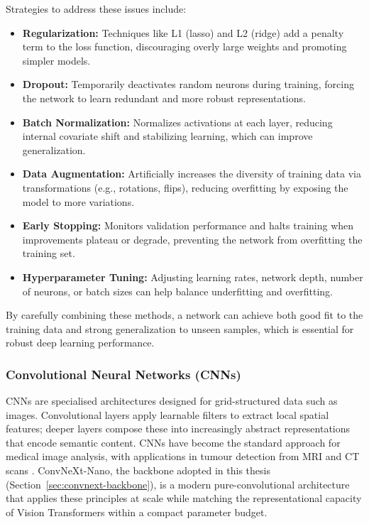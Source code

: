Strategies to address these issues include:

\begin{itemize}
    \item \textbf{Regularization:} Techniques like L1 (lasso) and L2 (ridge)
    add a penalty term to the loss function, discouraging overly large weights and promoting simpler models.
    \item \textbf{Dropout:} Temporarily deactivates random neurons during
    training, forcing the network to learn redundant and more robust representations.
    \item \textbf{Batch Normalization:} Normalizes activations at each layer,
    reducing internal covariate shift and stabilizing learning, which can improve generalization.
    \item \textbf{Data Augmentation:} Artificially increases the diversity of
    training data via transformations (e.g., rotations, flips), reducing overfitting by exposing the model to more variations.
    \item \textbf{Early Stopping:} Monitors validation performance and halts
    training when improvements plateau or degrade, preventing the network from overfitting the training set.
    \item \textbf{Hyperparameter Tuning:} Adjusting learning rates, network depth,
    number of neurons, or batch sizes can help balance underfitting and overfitting.
\end{itemize}

By carefully combining these methods, a network can achieve both good fit to the
training data and strong generalization to unseen samples, which is essential for
robust deep learning performance.

\subsubsection{Convolutional Neural Networks (CNNs)}

CNNs are specialised architectures designed for grid-structured data such as images.
Convolutional layers apply learnable filters to extract local spatial features;
deeper layers compose these into increasingly abstract representations that encode
semantic content.
CNNs have become the standard approach for medical image analysis, with applications
in tumour detection from MRI and CT scans \cite{litjens2017survey}.
ConvNeXt-Nano, the backbone adopted in this thesis
(Section~\ref{sec:convnext-backbone}), is a modern pure-convolutional architecture
that applies these principles at scale while matching the representational capacity
of Vision Transformers within a compact parameter budget.

